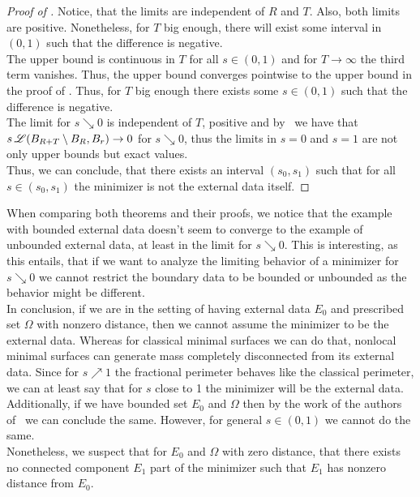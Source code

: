 \begin{proof}[Proof of ]
	Notice, that the limits are independent of \( R \) and \( T \). Also, both limits are positive.
	Nonetheless, for \( T \) big enough, there will exist some interval in \( (0, 1) \) such that the
	difference is negative. \\

	The upper bound  is continuous in \( T \) for all \( s \in (0, 1) \) and for \( T \to
	\infty \) the third term vanishes. Thus, the upper bound converges pointwise to the upper bound in
	the proof of . Thus, for \( T \) big enough there exists some \( s \in (0, 1) \) such
	that the difference is negative. \\

	The limit for \( s \searrow 0 \) is independent of \( T \), positive and by~\cite[Eq.
		(3.2)]{dipierro2012asymptotics} we have that \( s \operatorname{\mathscr{L}}(B_{R + T}\setminus B_R, B_r) \to 0 \) for \(
	s \searrow 0 \), thus the limits in \( s = 0 \) and \( s = 1 \) are not only upper bounds but
	exact values. \\

	Thus, we can conclude, that there exists an interval \( (s_0, s_1) \) such that for all \( s \in
	(s_0, s_1) \) the minimizer is not the external data itself.

\end{proof}

When comparing both theorems and their proofs, we notice that the example with bounded external
data doesn't seem to converge to the example of unbounded external data, at least in the limit for
\( s \searrow 0 \). This is interesting, as this entails, that if we want to analyze the limiting
behavior of a minimizer for \( s \searrow 0 \) we cannot restrict the boundary data to be bounded or
unbounded as the behavior might be different. \\

In conclusion, if we are in the setting of having external data \( E_0 \) and prescribed set \(
\Omega \) with nonzero distance, then we cannot assume the minimizer to be the external data.
Whereas for classical minimal surfaces we can do that, nonlocal minimal surfaces can generate mass
completely disconnected from its external data. Since for \( s \nearrow 1 \) the fractional
perimeter behaves like the classical perimeter, we can at least say that for \( s \) close to 1 the
minimizer will be the external data. Additionally, if we have bounded set \( E_0 \) and \( \Omega
\) then by the work of the authors of~\cite{dipierro2012asymptotics} we can conclude the same.
However, for general \( s \in (0, 1) \) we cannot do the same. \\
Nonetheless, we suspect that for \( E_0 \) and \( \Omega \) with zero distance, that there exists
no connected component \( E_1 \) part of the minimizer such that \( E_1 \) has nonzero distance
from \( E_0 \).
